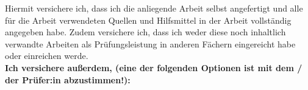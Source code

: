 Hiermit versichere ich, dass ich die anliegende Arbeit selbst angefertigt und alle für die Arbeit verwendeten Quellen
und Hilfsmittel in der Arbeit vollständig angegeben habe. Zudem versichere ich, dass ich weder diese noch inhaltlich verwandte Arbeiten als Prüfungsleistung in anderen Fächern eingereicht habe oder einreichen werde.
\\
\textbf{Ich versichere au{\ss}erdem, (eine der folgenden Optionen ist mit dem / der Prüfer:in abzustimmen!):}


